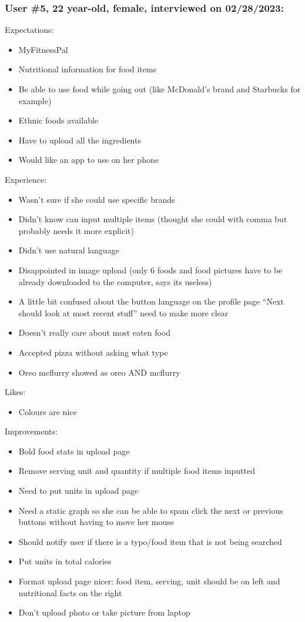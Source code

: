 \documentclass[12pt, titlepage]{article}
\begin{document}
	\subsubsection*{User \#5, 22 year-old, female, interviewed on 02/28/2023:}
	Expectations:
	\begin{itemize}
		\item  MyFitnessPal
		\item Nutritional information for food items
		\item Be able to use food while going out (like McDonald's brand and Starbucks for example)
		\item Ethnic foods available
		\item Have to upload all the ingredients
		\item Would like an app to use on her phone
	\end{itemize}
	Experience:
	\begin{itemize}
		\item Wasn't sure if she could use specific brands
		\item Didn’t know can input multiple items (thought she could with comma but probably needs it more
		explicit)
		\item Didn’t use natural language
		\item  Disappointed in image upload (only 6 foods and food pictures have to be already downloaded to
		the computer, says its useless)
		\item A little bit confused about the button language on the profile page “Next should look at most
		recent stuff” need to make more clear
		\item Doesn’t really care about most eaten food
		\item Accepted pizza without asking what type
		\item Oreo mcflurry showed as oreo AND mcflurry
	\end{itemize}
	Likes:
	\begin{itemize}
		\item Colours are nice
	\end{itemize}
	Improvements:
	\begin{itemize}
		\item Bold food stats in upload page
		\item Remove serving unit and quantity if multiple food items inputted
		\item Need to put units in upload page
		\item Need a static graph so she can be able to spam click the next or previous buttons without
		having to move her mouse
		\item Should notify user if there is a typo/food item that is not being searched
		\item Put units in total calories
		\item Format upload page nicer: food item, serving, unit should be on left and nutritional facts on the
		right
		\item Don’t upload photo or take picture from laptop
	\end{itemize}
\end{document}
